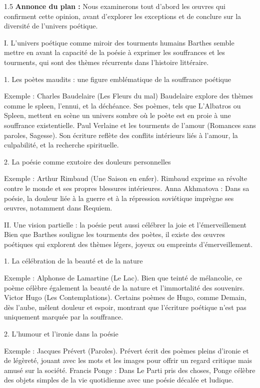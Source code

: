 \documentclass[12pt]{article}
\begin{document}
\begin{spacing}{1.5}
\textbf{ Annonce du plan :} Nous examinerons tout d'abord les œuvres qui confirment cette opinion, avant d'explorer les exceptions et de conclure sur la diversité de l'univers poétique.

\quad
I. L'univers poétique comme miroir des tourments humains
Barthes semble mettre en avant la capacité de la poésie à exprimer les souffrances et les tourments, qui sont des thèmes récurrents dans l'histoire littéraire.

1. Les poètes maudits : une figure emblématique de la souffrance poétique

Exemple : Charles Baudelaire (Les Fleurs du mal)
Baudelaire explore des thèmes comme le spleen, l'ennui, et la déchéance. Ses poèmes, tels que L'Albatros ou Spleen, mettent en scène un univers sombre où le poète est en proie à une souffrance existentielle.
Paul Verlaine et les tourments de l'amour (Romances sans paroles, Sagesse).
Son écriture reflète des conflits intérieurs liés à l'amour, la culpabilité, et la recherche spirituelle.

2. La poésie comme exutoire des douleurs personnelles

Exemple : Arthur Rimbaud (Une Saison en enfer).
Rimbaud exprime sa révolte contre le monde et ses propres blessures intérieures.
Anna Akhmatova : Dans sa poésie, la douleur liée à la guerre et à la répression soviétique imprègne ses œuvres, notamment dans Requiem.

\quad
II. Une vision partielle : la poésie peut aussi célébrer la joie et l'émerveillement
Bien que Barthes souligne les tourments des poètes, il existe des œuvres poétiques qui explorent des thèmes légers, joyeux ou empreints d'émerveillement.

1. La célébration de la beauté et de la nature

Exemple : Alphonse de Lamartine (Le Lac).
Bien que teinté de mélancolie, ce poème célèbre également la beauté de la nature et l'immortalité des souvenirs.
Victor Hugo (Les Contemplations).
Certains poèmes de Hugo, comme Demain, dès l'aube, mêlent douleur et espoir, montrant que l'écriture poétique n'est pas uniquement marquée par la souffrance.

2. L'humour et l'ironie dans la poésie

Exemple : Jacques Prévert (Paroles).
Prévert écrit des poèmes pleins d'ironie et de légèreté, jouant avec les mots et les images pour offrir un regard critique mais amusé sur la société.
Francis Ponge : Dans Le Parti pris des choses, Ponge célèbre des objets simples de la vie quotidienne avec une poésie décalée et ludique.


\end{spacing}
\end{document}
